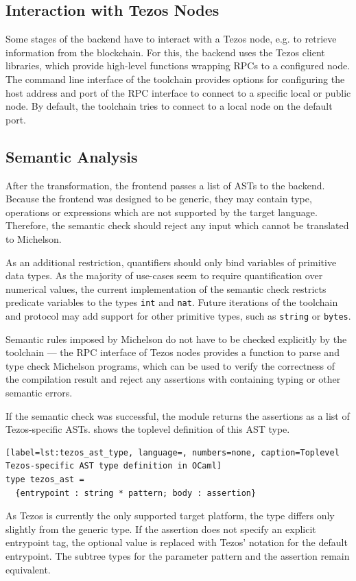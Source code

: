 \subsection{Interaction with Tezos Nodes}
Some stages of the backend have to interact with a Tezos node, e.g. to retrieve information from the blockchain. For this, the backend uses the Tezos client libraries, which provide high-level functions wrapping RPCs to a configured node. The command line interface of the toolchain provides options for configuring the host address and port of the RPC interface to connect to a specific local or public node. By default, the toolchain tries to connect to a local node on the default port.

\subsection{Semantic Analysis}
After the transformation, the frontend passes a list of ASTs to the backend. Because the frontend was designed to be generic, they may contain type, operations or expressions which are not supported by the target language. Therefore, the semantic check should reject any input which cannot be translated to Michelson.

As an additional restriction, quantifiers should only bind variables of primitive data types. As the majority of use-cases seem to require quantification over numerical values, the current implementation of the semantic check restricts predicate variables to the types \texttt{int} and \texttt{nat}. Future iterations of the toolchain and protocol may add support for other primitive types, such as \texttt{string} or \texttt{bytes}.

Semantic rules imposed by Michelson do not have to be checked explicitly by the toolchain --- the RPC interface of Tezos nodes provides a function to parse and type check Michelson programs, which can be used to verify the correctness of the compilation result and reject any assertions with containing typing or other semantic errors.

If the semantic check was successful, the module returns the assertions as a list of Tezos-specific ASTs.  shows the toplevel definition of this AST type.
\begin{lstlisting}[label=lst:tezos_ast_type, language=, numbers=none, caption=Toplevel Tezos-specific AST type definition in OCaml]
type tezos_ast =
  {entrypoint : string * pattern; body : assertion}
\end{lstlisting}
As Tezos is currently the only supported target platform, the type differs only slightly from the generic type. If the assertion does not specify an explicit entrypoint tag, the optional value is replaced with Tezos' notation for the default entrypoint. The subtree types for the parameter pattern and the assertion remain equivalent.

